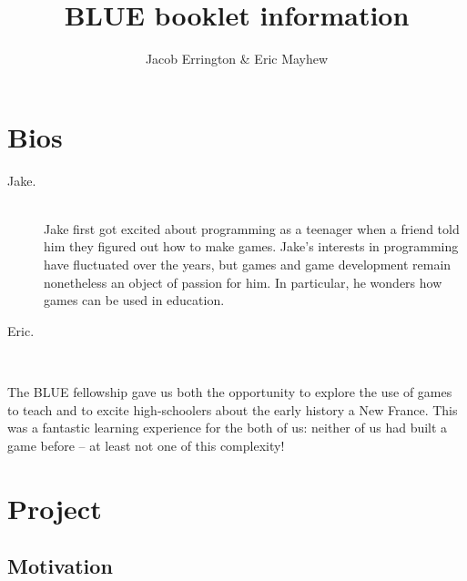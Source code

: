 \documentclass[11pt]{article}
\author{Jacob Errington \& Eric Mayhew}
\title{BLUE booklet information}
\begin{document}
\maketitle

\section{Bios}
\begin{description}
\item[Jake.] ~ \\
  Jake first got excited about programming as a teenager when a friend told him
  they figured out how to make games. Jake's interests in programming have
  fluctuated over the years, but games and game development remain nonetheless
  an object of passion for him. In particular, he wonders how games can be used
  in education.

\item[Eric.] ~
\end{description}

The BLUE fellowship gave us both the opportunity to explore the use of games to
teach and to excite high-schoolers about the early history a New France. This
was a fantastic learning experience for the both of us: neither of us had built
a game before -- at least not one of this complexity!

\section{Project}

\subsection{Motivation}
\end{document}

